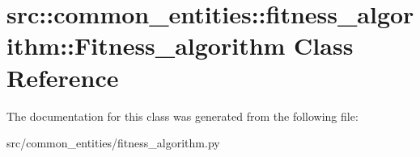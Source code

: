 \hypertarget{classsrc_1_1common__entities_1_1fitness__algorithm_1_1Fitness__algorithm}{
\section{src::common\_\-entities::fitness\_\-algorithm::Fitness\_\-algorithm Class Reference}
\label{classsrc_1_1common__entities_1_1fitness__algorithm_1_1Fitness__algorithm}
}


The documentation for this class was generated from the following file:\begin{DoxyCompactItemize}
\item 
src/common\_\-entities/fitness\_\-algorithm.py\end{DoxyCompactItemize}
